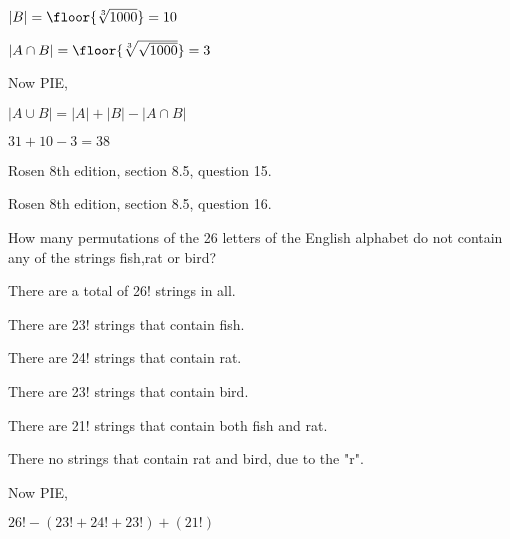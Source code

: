 $|B| = \floor{\sqrt[3]{1000}} = 10$

$|A \cap B| = \floor{\sqrt[3]{\sqrt{1000}}} = 3$

Now PIE,

$|A \cup B| = |A| + |B| - |A \cap B|$

$31 + 10 - 3 = 38$




\newpage
\nextq Rosen 8th edition, section 8.5, question 15.

\SOLUTION



\newpage
\nextq Rosen 8th edition, section 8.5, question 16.

\SOLUTION
How many permutations of the 26 letters of the English
alphabet do not contain any of the strings fish,rat or bird?

There are a total of 26! strings in all.

There are 23! strings that contain fish.

There are 24! strings that contain rat.

There are 23! strings that contain bird.

There are 21! strings that contain both fish and rat.

There no strings that contain rat and bird, due to the "r". 

Now PIE,

$26! - (23! + 24! + 23!) + (21!) $






\newpage


